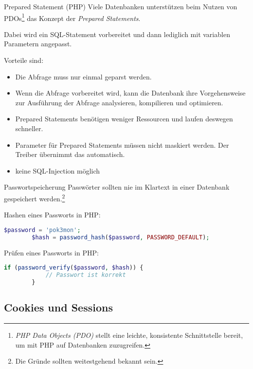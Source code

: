 \begin{bonus}{Prepared Statement (PHP)}
    Viele Datenbanken unterstützen beim Nutzen von PDOs\footnote{\emph{PHP Data Objects (PDO)} stellt eine leichte, konsistente Schnittstelle bereit, um mit PHP auf Datenbanken zuzugreifen.} das Konzept der \emph{Prepared Statements}.

    Dabei wird ein SQL-Statement vorbereitet und dann lediglich mit variablen Parametern angepasst.

    Vorteile sind:
    \begin{itemize}
        \item Die Abfrage muss nur einmal geparst werden.
        \item Wenn die Abfrage vorbereitet wird, kann die Datenbank ihre Vorgehensweise zur Ausführung der Abfrage analysieren, kompilieren und optimieren.
        \item Prepared Statements benötigen weniger Ressourcen und laufen deswegen schneller.
        \item Parameter für Prepared Statements müssen nicht maskiert werden. Der Treiber übernimmt das automatisch.
        \item keine SQL-Injection möglich
    \end{itemize}
\end{bonus}

\begin{bonus}{Passwortspeicherung}
    Passwörter sollten nie im Klartext in einer Datenbank gespeichert werden.\footnote{Die Gründe sollten weitestgehend bekannt sein.}

    Hashen eines Passworts in PHP:
    \begin{lstlisting}[language=php]
        $password = 'pok3mon';
        $hash = password_hash($password, PASSWORD_DEFAULT);
    \end{lstlisting}

    Prüfen eines Passworts in PHP:
    \begin{lstlisting}[language=php]
        if (password_verify($password, $hash)) {
            // Passwort ist korrekt
        }
    \end{lstlisting}
\end{bonus}

\subsection{Cookies und Sessions}

